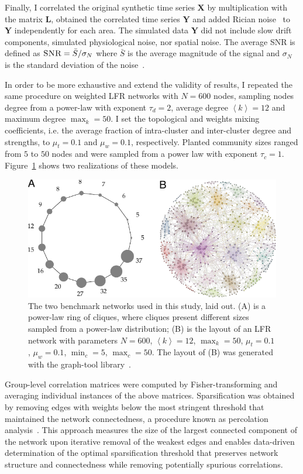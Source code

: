 Finally, I correlated the original synthetic time series $\mathbf{X}$ by multiplication with the matrix $\mathbf{L}$, obtained the correlated time series $\mathbf{Y}$ and added Rician noise~\cite{Gudbjartsson1995} to $\mathbf{Y}$ independently for each area.
The simulated data $\mathbf{Y}$ did not include slow drift components, simulated physiological noise, nor spatial noise.
The average SNR is defined as $\textsc{SNR}=\bar{S}/\sigma_N$ where $\bar{S}$ is the average magnitude of the signal and $\sigma_N$ is the standard deviation of the noise~\cite{kruger2011}.

In order to be more exhaustive and extend the validity of results, I repeated the same procedure on weighted LFR networks with $N=600$ nodes, sampling nodes degree from a power-law with exponent $\tau_d=2$, average degree $\left<k\right>=12$ and maximum degree $\max_k=50$.
I set the topological and weights mixing coefficients, i.e.
the average fraction of intra-cluster and inter-cluster degree and strengths, to $\mu_t=0.1$ and $\mu_w=0.1$, respectively.
Planted community sizes ranged from $5$ to $50$ nodes and were sampled from a power law with exponent $\tau_c=1$.
Figure~\ref{fig:lfrringclique} shows two realizations of these models.

\begin{figure}[!htb]
\centering
\includegraphics[width=1\textwidth]{images/pacopaperfigure1.pdf}
\caption{The two benchmark networks used in this study, laid out.
(A) is a power-law ring of cliques, where cliques present different sizes sampled from a power-law distribution;
(B) is the layout of an LFR network with parameters $N=600$, $\left< k \right>=12$, $\max_k=50$, $\mu_t=0.1$, $\mu_w=0.1$, $\min_c=5$, $\max_c=50$.
The layout of (B) was generated with the graph-tool library~\cite{peixoto_graph_tool_2014}.}
\label{fig:lfrringclique}
\end{figure}

Group-level correlation matrices were computed by Fisher-transforming and averaging individual instances of the above matrices.
Sparsification was obtained by removing edges with weights below the most stringent threshold that maintained the network connectedness, a procedure known as percolation analysis~\cite{gallos2012,bardella2016a,alexander-bloch2010}.
This approach measures the size of the largest connected component of the network upon iterative removal of the weakest edges and enables data-driven determination of the optimal sparsification threshold that preserves network structure and connectedness while removing potentially spurious correlations.

